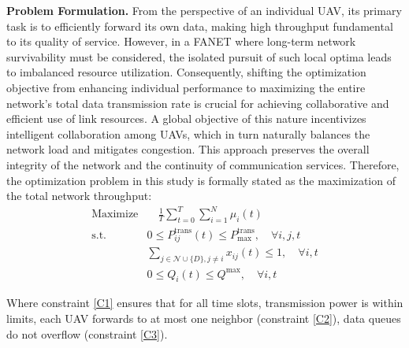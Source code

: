 \documentclass[runningheads]{llncs}
\begin{document}
\textbf{Problem Formulation.} From the perspective of an individual UAV, its primary task is to efficiently forward its own data, making high throughput fundamental to its quality of service. However, in a FANET where long-term network survivability must be considered, the isolated pursuit of such local optima leads to imbalanced resource utilization. Consequently, shifting the optimization objective from enhancing individual performance to maximizing the entire network's total data transmission rate is crucial for achieving collaborative and efficient use of link resources. A global objective of this nature incentivizes intelligent collaboration among UAVs, which in turn naturally balances the network load and mitigates congestion. This approach preserves the overall integrity of the network and the continuity of communication services. Therefore, the optimization problem in this study is formally stated as the maximization of the total network throughput:
\begin{align}
\text{Maximize} & \quad \frac{1}{T}\sum_{t=0}^{T} \sum_{i=1}^{N} \mu_i(t) \\
\text{s.t.} \quad 
&0 \le P_{ij}^{\text{trans}}(t) \le P_{\text{max}}^{\text{trans}}, \quad \forall i,j,t \label{C1}\\
& \sum_{j \in \mathcal{N} \cup \{D\}, j \neq i} x_{ij}(t) \le 1, \quad \forall i,t \label{C2}\\
& 0 \le Q_i(t) \le Q^{\text{max}}, \quad \forall i,t \label{C3}
\end{align}

Where constraint \ref{C1} ensures that for all time slots, transmission power is within limits, each UAV forwards to at most one neighbor (constraint \ref{C2}), data queues do not overflow (constraint \ref{C3}).
\end{document}
